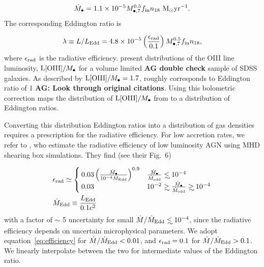 \documentclass[usenatbib,fleqn]{mnras}
\newcommand\lsim{\mathrel{\rlap{\lower4pt\hbox{\hskip1pt$\sim$}}
    \raise1pt\hbox{$<$}}}
\newcommand\gsim{\mathrel{\rlap{\lower4pt\hbox{\hskip1pt$\sim$}}
    \raise1pt\hbox{$>$}}}
\newcommand{\Mbh}[1][]{M_{\bullet#1}}
\newcommand{\Msun}{{\rm M_\odot}}
\begin{document}
\begin{equation}
  \dot{M}_{\bullet} = 1.1\times 10^{-5} \Mbh[,7]^{0.5} f_{\rm in}
  n_{18} \,\,\Msun {\rm yr}^{-1}.
\end{equation}
%
The corresponding Eddington ratio is

\begin{equation}
  \lambda\equiv L/L_{\rm Edd} = 4.8 \times 10^{-5}
  \left(\frac{\epsilon_{\rm rad}}{0.1}\right) \Mbh[,7]^{0.5} f_{\rm in}
  n_{18},
\label{eq:n18Edd}
\end{equation}
%
where $\epsilon_{\rm rad}$ is the radiative
efficiency. \citet{Kauffmann&Heckman2009} present distributions of the
OIII line luminosity, ${\rm L[OIII]}/\Mbh$ for a volume limited {\bf
  AG double check} sample of SDSS galaxies.  As described by
\citet{Kauffmann&Heckman2009} ${\rm L[OIII]}/\Mbh=1.7$, roughly
corresponds to Eddington ratio of 1 {\bf AG: Look through original
  citations}. Using this bolometric correction maps the distribution
of ${\rm L[OIII]}/\Mbh$ from \citet{Kauffmann&Heckman2009} to a
distribution of Eddington ratios.

Converting this distribution Eddington ratios into a distribution of
gas densities requires a prescription for the radiative efficiency.  For
low accretion rates, we refer to \citet{Sharma+2007}, who estimate the
radiative efficiency of low luminosity AGN using MHD shearing box
simulations.  They find (see their Fig.~6)

\begin{align}
&\epsilon_{\rm rad} \simeq 
\begin{cases}
  0.03 \left(\frac{\dot{M}_{\bullet}}{10^{-4}\dot{M}_{\rm Edd}}\right)^{0.9} & \frac{\dot{M}_{\bullet}}{\dot{M}_{\rm edd}} \lsim 10^{-4} \\
 0.03 &  10^{-2} \gsim \frac{\dot{M}_{\bullet}}{\dot{M}_{\rm edd}}
 \gsim  10^{-4}
\end{cases}\nonumber\\
&\dot{M}_{\rm Edd} \equiv \frac{L_{\rm Edd}}{0.1 c^2}
\label{eq:efficiency}
\end{align}
%
with a factor of $\sim$ 5 uncertainty for small $\dot{M}/\dot{M}_{\rm
  Edd}\lsim 10^{-4}$, since the radiative efficiency depends on
uncertain microphysical parameters. We adopt
equation~\eqref{eq:efficiency} for $\dot{M}/\dot{M}_{\rm Edd}<0.01$,
and $\epsilon_{\rm rad}=0.1$ for $\dot{M}/\dot{M}_{\rm Edd}>0.1$. We
linearly interpolate between the two for intermediate values of the
Eddington ratio.
\end{document}
